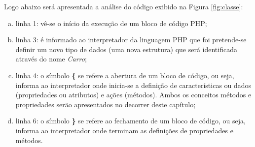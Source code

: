 \FloatBarrier 	%

Logo abaixo será apresentada a análise do código exibido na
Figura \ref{fig:classe}:

\begin{enumerate}[a)]
    \item linha 1: vê-se o início da execução de um bloco de código
    PHP;
    \item linha 3: é informado ao interpretador da linguagem PHP que
    foi pretende-se definir um novo tipo de dados (uma nova estrutura) que será
    identificada através do nome \textit{Carro};
    \item linha 4: o símbolo \textbf{\{} se refere a abertura de um
    bloco de código, ou seja, informa ao interpretador onde inicia-se a definição de
    características ou dados (propriedades ou atributos) e ações (métodos).
    Ambos os conceitos métodos e propriedades serão apresentados no decorrer
    deste capítulo;
    \item linha 6: o símbolo \textbf{\}} se refere ao fechamento de um
    bloco de código, ou seja, informa ao interpretador onde terminam as
    definições de propriedades e métodos.
\end{enumerate}
